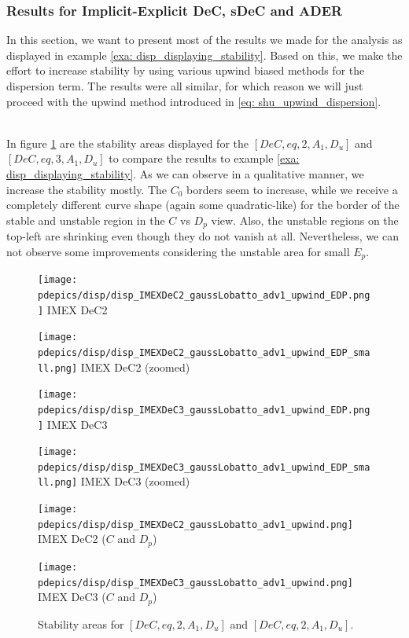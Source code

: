 \subsubsection{Results for Implicit-Explicit DeC, sDeC and ADER}
In this section, we want to present most of the results we made for the analysis as displayed in example \ref{exa: disp_displaying_stability}. Based on this, we make the effort to increase stability by using various upwind biased methods for the dispersion term. The results were all similar, for which reason we will just proceed with the upwind method introduced in \eqref{eq: shu_upwind_dispersion}.
\begin{example}\label{exa: disp_displaying_stability_upwind}\mbox{}\\
	In figure \ref{fig: disp_IIMEXDeC2/3_GLB_CvsE_upwind} are the stability areas displayed for the $[DeC, eq,2,A_1,D_u]$ and \\$[DeC, eq,3, A_1,D_u]$ to compare the results to example \ref{exa: disp_displaying_stability}.
	As we can observe in a qualitative manner, we increase the stability mostly. The $C_0$ borders seem to increase, while we receive a completely different curve shape (again some quadratic-like) for the border of the stable and unstable region in the $C$ vs $D_p$ view. Also, the unstable regions on the top-left are shrinking even though they do not vanish at all. Nevertheless, we can not observe some improvements considering the unstable area for small $E_p$.
	\begin{figure}[!h]
		\centering
		\begin{minipage}[t]{0.45\textwidth}
			\centering
			\texttt{[image: pdepics/disp/disp\_IMEXDeC2\_gaussLobatto\_adv1\_upwind\_EDP.png]}
			IMEX DeC2
		\end{minipage} 
		\begin{minipage}[t]{0.45\textwidth}
			\centering
			\texttt{[image: pdepics/disp/disp\_IMEXDeC2\_gaussLobatto\_adv1\_upwind\_EDP\_small.png]}
			IMEX DeC2 (zoomed)
		\end{minipage}
		\begin{minipage}[t]{0.45\textwidth}
			\centering
			\texttt{[image: pdepics/disp/disp\_IMEXDeC3\_gaussLobatto\_adv1\_upwind\_EDP.png]}
			IMEX DeC3
		\end{minipage}
		\begin{minipage}[t]{0.45\textwidth}
			\centering
			\texttt{[image: pdepics/disp/disp\_IMEXDeC3\_gaussLobatto\_adv1\_upwind\_EDP\_small.png]}
			IMEX DeC3 (zoomed)
		\end{minipage}
		\begin{minipage}[t]{0.45\textwidth}
			\centering
			\texttt{[image: pdepics/disp/disp\_IMEXDeC2\_gaussLobatto\_adv1\_upwind.png]}
			IMEX DeC2 ($C$ and $D_p$)
		\end{minipage}
		\begin{minipage}[t]{0.45\textwidth}
			\centering
			\texttt{[image: pdepics/disp/disp\_IMEXDeC3\_gaussLobatto\_adv1\_upwind.png]}
			IMEX DeC3 ($C$ and $D_p$)
		\end{minipage}
		\caption{Stability areas for $[DeC, eq,2,A_1, D_u]$ and $[DeC, eq,2,A_1, D_u]$.}
		\label{fig: disp_IIMEXDeC2/3_GLB_CvsE_upwind}
	\end{figure}
\end{example}
